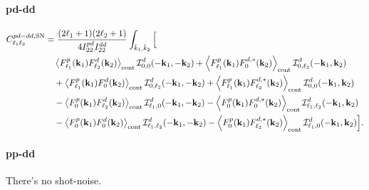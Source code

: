 \documentclass[a4paper,11pt]{article}
\begin{document}
\paragraph{pd-dd}
\begin{align}
C^{pd-dd,{\rm SN}}_{\ell_1\ell_2}
&=
\frac{(2\ell_1+1)(2\ell_2+1)}
{4I^{pd}_{22}I^{dd}_{22}}
\int_{\hat k_1,\hat k_2}
\Big[
\nonumber\\
&\quad
\left\langle
F^p_{\ell_1}(\mathbf k_1)F^d_{\ell_2}(\mathbf k_2)
\right\rangle_{\rm cont}
\mathcal I^d_{0,0}(-\mathbf k_1,-\mathbf k_2) +
\left\langle
F^p_{\ell_1}(\mathbf k_1)F^{d,*}_{0}(\mathbf k_2)
\right\rangle_{\rm cont}
\mathcal I^d_{0,\ell_2}(-\mathbf k_1,\mathbf k_2)
\nonumber\\
&\quad+
\left\langle
F^p_{\ell_1}(\mathbf k_1)F^d_{0}(\mathbf k_2)
\right\rangle_{\rm cont}
\mathcal I^d_{0,\ell_2}(-\mathbf k_1,-\mathbf k_2)+
\left\langle
F^p_{\ell_1}(\mathbf k_1)F^{d,*}_{\ell_2}(\mathbf k_2)
\right\rangle_{\rm cont}
\mathcal I^d_{0,0}(-\mathbf k_1,\mathbf k_2)
\nonumber\\
&\quad-
\left\langle
F^p_{0}(\mathbf k_1)F^d_{\ell_2}(\mathbf k_2)
\right\rangle_{\rm cont}
\mathcal I^d_{\ell_1,0}(-\mathbf k_1,-\mathbf k_2)-
\left\langle
F^p_{0}(\mathbf k_1)F^{d,*}_{0}(\mathbf k_2)
\right\rangle_{\rm cont}
\mathcal I^d_{\ell_1,\ell_2}(-\mathbf k_1,\mathbf k_2)
\nonumber\\
&\quad-
\left\langle
F^p_{0}(\mathbf k_1)F^d_{0}(\mathbf k_2)
\right\rangle_{\rm cont}
\mathcal I^d_{\ell_1,\ell_2}(-\mathbf k_1,-\mathbf k_2)-
\left\langle
F^p_{0}(\mathbf k_1)F^{d,*}_{\ell_2}(\mathbf k_2)
\right\rangle_{\rm cont}
\mathcal I^d_{\ell_1,0}(-\mathbf k_1,\mathbf k_2)
\Big].
\end{align}

\paragraph{pp-dd}

There's no shot-noise. 
\end{document}
